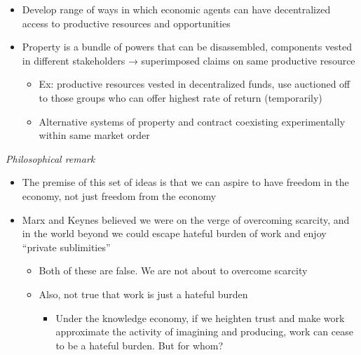 \begin{itemize}
\begin{enumerate}
    \begin{itemize}
    \tightlist
    \item
      Develop range of ways in which economic agents can have
      decentralized access to productive resources and opportunities
    \item
      Property is a bundle of powers that can be disassembled,
      components vested in different stakeholders → superimposed claims
      on same productive resource

      \begin{itemize}
      \tightlist
      \item
        Ex: productive resources vested in decentralized funds, use
        auctioned off to those groups who can offer highest rate of
        return (temporarily)
      \item
        Alternative systems of property and contract coexisting
        experimentally within same market order
      \end{itemize}
    \end{itemize}
  \end{enumerate}
\end{itemize}

\emph{Philosophical remark}

\begin{itemize}
\tightlist
\item
  The premise of this set of ideas is that we can aspire to have freedom
  in the economy, not just freedom from the economy
\item
  Marx and Keynes believed we were on the verge of overcoming scarcity,
  and in the world beyond we could escape hateful burden of work and
  enjoy ``private sublimities''

  \begin{itemize}
  \tightlist
  \item
    Both of these are false. We are not about to overcome scarcity
  \item
    Also, not true that work is just a hateful burden

    \begin{itemize}
    \tightlist
    \item
      Under the knowledge economy, if we heighten trust and make work
      approximate the activity of imagining and producing, work can
      cease to be a hateful burden. But for whom?
    \end{itemize}
  \end{itemize}
\end{itemize}

